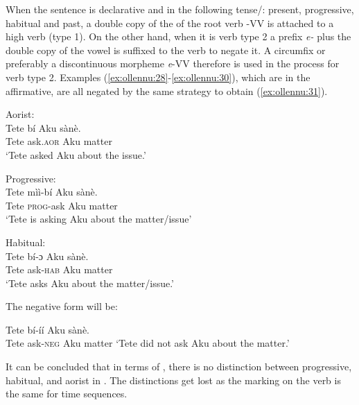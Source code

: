 \documentclass[output=paper
,newtxmath
,modfonts
,nonflat]{langsci/langscibook}
\begin{document}
When the sentence is declarative and in the following tense/: present, progressive, habitual and past, a double copy of the  of the root verb -VV is attached to a high  verb (type 1). On the other hand, when it is verb type 2 a prefix \textit{e-} plus the double copy of the vowel is suffixed to the verb to negate it. A circumfix or preferably a discontinuous morpheme \textit{e}-VV therefore is used in the  process for verb type 2. Examples (\ref{ex:ollennu:28}-\ref{ex:ollennu:30}), which are in the affirmative, are all negated by the same strategy to obtain (\ref{ex:ollennu:31}).

\ea \label{ex:ollennu:28} 
Aorist:\\
\gll Tete b\'i Aku s\`an\`e.\\
Tete ask.\textsc{aor} Aku matter\\
\glt `Tete asked Aku about the issue.'
\z

\ea \label{ex:ollennu:29}
Progressive: \\
\gll Tete m\`i\`i-b\'i Aku s\`an\`e.\\
Tete \textsc{prog}-ask Aku matter\\
\glt `Tete is asking Aku about the matter/issue'
\z

\ea \label{ex:ollennu:30}
Habitual: \\
\gll Tete b\'i-ɔ Aku s\`an\`e.\\
Tete ask-\textsc{hab} Aku matter\\
\glt`Tete asks Aku about the matter/issue.'
\z

The negative form will be:

\ea \label{ex:ollennu:31}
Tete b\'i-\'i\'i Aku s\`an\`e.\\
Tete ask-\textsc{neg} Aku matter
\glt `Tete did not ask Aku about the matter.'
\z

It can be concluded that in terms of , there is no distinction between progressive, habitual, and aorist in . The distinctions get lost as the  marking on the verb is the same for time sequences.
\end{document}
